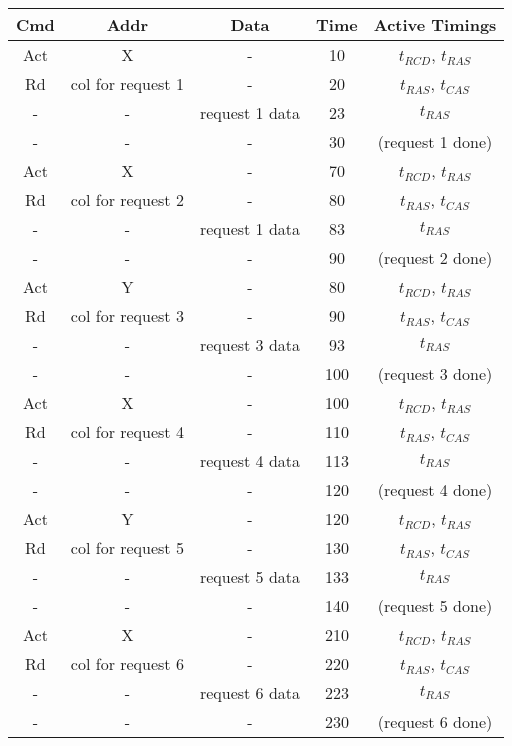 \documentclass[a4paper, 11pt]{exam}
\begin{document}
\begin{enumerate}
\begin{center}
	\begin{tabular}{|c|c|c|c|c|}
		\hline
		\textbf{Cmd} & \textbf{Addr} & \textbf{Data} & \textbf{Time} & \textbf{Active Timings}\\
		\hline
		Act & X & - & 10 & $t_{RCD}$, $t_{RAS}$\\ 
		\hline
		Rd & col for request 1 & - & 20 &  $t_{RAS}$, $t_{CAS}$\\
		\hline
		- & - & request 1 data & 23 & $t_{RAS}$ \\
		\hline
		- & - & - & 30 & (request 1 done)\\
		\hline
		Act & X & - & 70 & $t_{RCD}$, $t_{RAS}$\\ 
		\hline
		Rd & col for request 2 & - & 80 &  $t_{RAS}$, $t_{CAS}$\\
		\hline
		- & - & request 1 data & 83 & $t_{RAS}$ \\
		\hline
		- & - & - & 90 & (request 2 done)\\
		\hline
		Act & Y & - & 80 & $t_{RCD}$, $t_{RAS}$\\ 
		\hline
		Rd & col for request 3 & - & 90 &  $t_{RAS}$, $t_{CAS}$\\
		\hline
		- & - & request 3 data & 93 & $t_{RAS}$ \\
		\hline
		- & - & - & 100 & (request 3 done)\\
		\hline
		Act & X & - & 100 & $t_{RCD}$, $t_{RAS}$\\ 
		\hline
		Rd & col for request 4 & - & 110 &  $t_{RAS}$, $t_{CAS}$\\
		\hline
		- & - & request 4 data & 113 & $t_{RAS}$ \\
		\hline
		- & - & - & 120 & (request 4 done)\\
		\hline
		Act & Y & - & 120 & $t_{RCD}$, $t_{RAS}$\\ 
		\hline
		Rd & col for request 5 & - & 130 &  $t_{RAS}$, $t_{CAS}$\\
		\hline
		- & - & request 5 data & 133 & $t_{RAS}$ \\
		\hline
		- & - & - & 140 & (request 5 done)\\
		\hline
		Act & X & - & 210 & $t_{RCD}$, $t_{RAS}$\\ 
		\hline
		Rd & col for request 6 & - & 220 &  $t_{RAS}$, $t_{CAS}$\\
		\hline
		- & - & request 6 data & 223 & $t_{RAS}$ \\
		\hline
		- & - & - & 230 & (request 6 done)\\
		\hline
	\end{tabular}
\end{center}


\end{enumerate}
\end{document}
